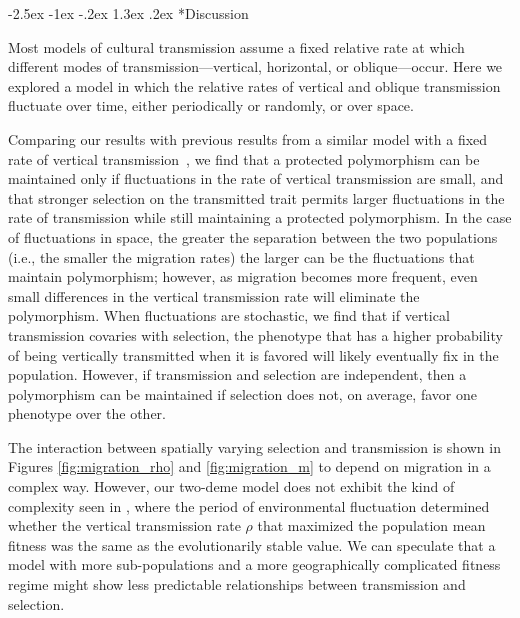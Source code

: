 \documentclass[14pt]{extarticle}
\makeatletter
\renewcommand\section{\@startsection {section}{1}{\z@}%
     {-2.5ex \@plus -1ex \@minus -.2ex}%
     {1.3ex \@plus.2ex}%
    {\Large\bfseries}}
\makeatother
\begin{document}
\section*{Discussion}

Most models of cultural transmission assume a fixed relative rate at which different modes of transmission---vertical, horizontal, or oblique---occur.
Here we explored a model in which the relative rates of vertical and oblique transmission fluctuate over time, either periodically or randomly, or over space.

Comparing our results with previous results from a similar model with a fixed rate of vertical transmission~\citep{Ram2018}, we find that a protected polymorphism can be maintained only if fluctuations in the rate of vertical transmission are small, and that stronger selection on the transmitted trait permits larger fluctuations in the rate of transmission while still maintaining a protected polymorphism. 
In the case of fluctuations in space, the greater the separation between the two populations (i.e., the smaller the migration rates) the larger can be the fluctuations that maintain polymorphism; however, as migration becomes more frequent, even small differences in the vertical transmission rate will eliminate the polymorphism.
When fluctuations are stochastic, we find that if vertical transmission covaries with selection, the phenotype that has a higher probability of being vertically transmitted  when it is favored will likely eventually fix in the population.
However, if transmission and selection are independent, then a polymorphism can be maintained if selection does not, on average, favor one phenotype over the other.

The interaction between spatially varying selection and transmission is shown in Figures \ref{fig:migration_rho} and \ref{fig:migration_m} to depend on migration in a complex way.
However, our two-deme model does not exhibit the kind of complexity seen in \citet{Ram2018}, where the period of environmental fluctuation determined whether the vertical transmission rate $\rho$ that maximized the population mean fitness was the same as the evolutionarily stable value.
We can speculate that a model with more sub-populations and a more geographically complicated fitness regime might show less predictable relationships between transmission and selection.
\end{document}
